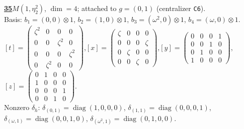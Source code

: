 \begin{samepage}\noindent\textbf{\underline{35}}\quad $M(1,\eta^{2}_{2})$, $\dim=4$; attached to $g=(0,1)$ (centralizer \texttt{C6}).\\
Basis: $b_{1}=(0,0)\otimes 1$, $b_{2}=(1,0)\otimes 1$, $b_{3}=(\omega^2,0)\otimes 1$, $b_{4}=(\omega,0)\otimes 1$.\\
$[t]=\left(\begin{smallmatrix} \zeta^2 & 0 & 0 & 0 \\ 0 & 0 & \zeta^2 & 0 \\ 0 & 0 & 0 & \zeta^2 \\ 0 & \zeta^2 & 0 & 0 \end{smallmatrix}\right)$,\quad $[x]=\left(\begin{smallmatrix} \zeta & 0 & 0 & 0 \\ 0 & 0 & 0 & \zeta \\ 0 & \zeta & 0 & 0 \\ 0 & 0 & \zeta & 0 \end{smallmatrix}\right)$,\quad $[y]=\left(\begin{smallmatrix} 0 & 0 & 0 & 1 \\ 0 & 0 & 1 & 0 \\ 0 & 1 & 0 & 0 \\ 1 & 0 & 0 & 0 \end{smallmatrix}\right)$,\quad $[z]=\left(\begin{smallmatrix} 0 & 1 & 0 & 0 \\ 1 & 0 & 0 & 0 \\ 0 & 0 & 0 & 1 \\ 0 & 0 & 1 & 0 \end{smallmatrix}\right)$.\\
Nonzero $\delta_h$: $\delta_{(0,1)}=\operatorname{diag}(1,0,0,0)$, $\delta_{(1,1)}=\operatorname{diag}(0,0,0,1)$, $\delta_{(\omega,1)}=\operatorname{diag}(0,0,1,0)$, $\delta_{(\omega^2,1)}=\operatorname{diag}(0,1,0,0)$.\end{samepage}
\medskip

